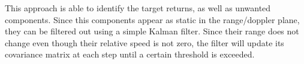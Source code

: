 This approach is able to identify the target returns, as well as unwanted components. Since this components appear as static in the range/doppler plane, they can be filtered out using a simple Kalman filter. Since their range does not change even though their relative speed is not zero, the filter will update its covariance matrix at each step until a certain threshold is exceeded.





